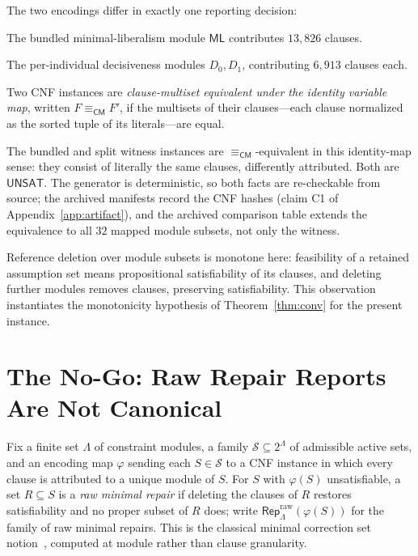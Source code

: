 \documentclass[sigplan,10pt,review,anonymous]{acmart}
\theoremstyle{acmdefinition}
\newcommand{\CM}{\equiv_{\mathsf{CM}}}
\newcommand{\Lam}{\Lambda}
\newcommand{\Rep}{\mathsf{Rep}}
\newcommand{\UNSAT}{\mathsf{UNSAT}}
\newcommand{\ML}{\mathsf{ML}}
\begin{document}
The two encodings differ in exactly one reporting decision:
\begin{description}[leftmargin=1.4em]
\item[Bundled.] The bundled minimal-liberalism module $\ML$ contributes
$13{,}826$ clauses.
\item[Split.] The per-individual decisiveness modules
$D_0, D_1$, contributing $6{,}913$ clauses each.
\end{description}

\begin{definition}
\label{def:cm}
Two CNF instances are \emph{clause-multiset equivalent under the identity
variable map}, written $F \CM F'$, if the multisets of their clauses---each
clause normalized as the sorted tuple of its literals---are equal.
\end{definition}

The bundled and split witness instances are $\CM$-equivalent in this
identity-map sense: they consist of literally the same clauses, differently
attributed. Both are $\UNSAT$. The generator is deterministic, so both facts
are re-checkable from source; the archived manifests record the CNF hashes
(claim C1 of Appendix~\ref{app:artifact}), and the archived comparison table
extends the equivalence to all $32$ mapped module subsets, not only the
witness.

Reference deletion over module subsets is monotone here: feasibility of a
retained assumption set means propositional satisfiability of its clauses,
and deleting further modules removes clauses, preserving satisfiability. This
observation instantiates the monotonicity hypothesis of
Theorem~\ref{thm:conv} for the present instance.

\section{The No-Go: Raw Repair Reports Are Not Canonical}
\label{sec:nogo}

Fix a finite set $\Lam$ of constraint modules, a family
$\mathcal{S} \subseteq 2^{\Lam}$ of admissible active sets, and an encoding
map $\varphi$ sending each $S \in \mathcal{S}$ to a CNF instance in which
every clause is attributed to a unique module of $S$. For $S$ with
$\varphi(S)$ unsatisfiable, a set $R \subseteq S$ is a \emph{raw minimal
repair} if deleting the clauses of $R$ restores satisfiability and no proper
subset of $R$ does; write $\Rep^{\mathrm{raw}}_{\Lam}(\varphi(S))$ for the
family of raw minimal repairs. This is the classical minimal correction set
notion~\cite{Reiter1987,LiffitonSakallah2008}, computed at module rather
than clause granularity.
\end{document}
